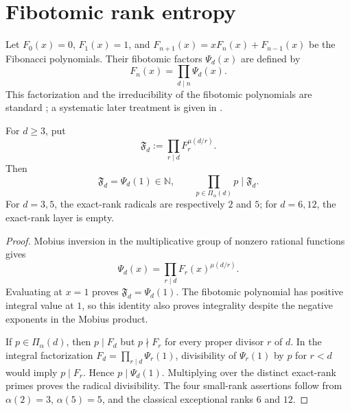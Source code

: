 \section{Fibotomic rank entropy}
\label{sec:fibotomic-entropy}

Let $F_0(x)=0$, $F_1(x)=1$, and
$F_{n+1}(x)=xF_n(x)+F_{n-1}(x)$ be the Fibonacci polynomials.  Their
fibotomic factors $\Psi_d(x)$ are defined by
\[
 F_n(x)=\prod_{d\mid n}\Psi_d(x).
\]
This factorization and the irreducibility of the fibotomic polynomials are
standard \cite{WebbParberry1969FibonacciPolynomials,
Levy2001FibonacciPolynomials}; a systematic later treatment is given in
\cite{CameronCountsLundMillerPiechnikWong2022Fibotomic}.

\begin{lemma}
\label{lem:fibotomic-radical}
For $d\geq3$, put
\[
 \mathfrak F_d:=\prod_{r\mid d}F_r^{\mu(d/r)}.
\]
Then
\[
 \mathfrak F_d=\Psi_d(1)\in\mathbb N,
 \qquad
 \prod_{p\in\Pi_\alpha(d)}p\mid\mathfrak F_d.
\]
For $d=3,5$, the exact-rank radicals are respectively $2$ and $5$; for
$d=6,12$, the exact-rank layer is empty.
\end{lemma}

\begin{proof}
Mobius inversion in the multiplicative group of nonzero rational functions
gives
\[
 \Psi_d(x)=\prod_{r\mid d}F_r(x)^{\mu(d/r)}.
\]
Evaluating at $x=1$ proves
$\mathfrak F_d=\Psi_d(1)$.  The fibotomic polynomial has positive integral
value at $1$, so this identity also proves integrality despite the negative
exponents in the Mobius product.

If $p\in\Pi_\alpha(d)$, then $p\mid F_d$ but $p\nmid F_r$ for every proper
divisor $r$ of $d$.  In the integral factorization
$F_d=\prod_{r\mid d}\Psi_r(1)$, divisibility of $\Psi_r(1)$ by $p$ for
$r<d$ would imply $p\mid F_r$.  Hence $p\mid\Psi_d(1)$.  Multiplying over
the distinct exact-rank primes proves the radical divisibility.  The four
small-rank assertions follow from $\alpha(2)=3$, $\alpha(5)=5$, and the
classical exceptional ranks $6$ and $12$.
\end{proof}

